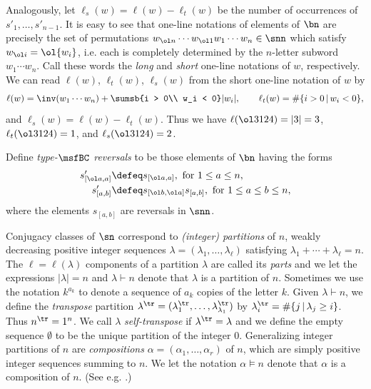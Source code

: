 Analogously, let $\ell_s(w) = \ell(w) - \ell_t(w)$ be the number
of occurrences of $s'_1,\dotsc,s'_{n-1}$.
It is easy to see that one-line notations of
elements of $\bn$ are precisely the set of
permutations $w_{\ol n} \cdots w_{\ol 1} w_1 \cdots w_n \in \snn$
which satisfy $w_{\ol i} = \ol{w_i}$,
i.e. each is completely determined by the $n$-letter subword
$w_1 \cdots w_n$.
Call these words the {\em long} and
{\em short}
one-line notations of $w$, respectively.
We can read $\ell(w)$, $\ell_t(w)$, $\ell_s(w)$ from the
short one-line notation of $w$ by
\begin{equation*}%
  \ell(w) = \inv(w_1 \cdots w_n) + \sumsb{i > 0\\ w_i < 0} |w_i|,
  \qquad
  \ell_t(w) = \# \{ i > 0 \,|\, w_i < 0 \},
  \end{equation*}
and $\ell_s(w) = \ell(w) - \ell_t(w)$.
Thus we have
  $\ell(\ol3124) = |3| = 3$, $\ell_t(\ol3124) = 1$, and $\ell_s(\ol3124) = 2$.

Define {\em type-$\msfBC$ reversals} to be those elements of $\bn$
having the forms
\begin{equation}\label{eq:creversal}
  \begin{aligned}
    s'_{\smash{[\ol a, a]}} &\defeq s_{\smash{[\ol a, a]}},
        \mbox{ for } 1 \leq a \leq n,\\
    s'_{\smash{[a,b]}} &\defeq s_{\smash{[\ol b, \ol a]}} s_{[a,b]},
    \mbox{ for } 1 \leq a \leq b \leq n,
  \end{aligned}
\end{equation}
where the elements $s_{[a,b]}$ are reversals in $\snn$.

\label{ss:conjclasses}
Conjugacy classes of $\sn$ correspond to {\em (integer) partitions} of $n$,
weakly decreasing positive integer sequences
$\lambda = (\lambda_1, \dotsc, \lambda_\ell)$
satisfying $\lambda_1 + \cdots + \lambda_\ell = n$.
The $\ell = \ell(\lambda)$ components of a partition $\lambda$
are called its {\em parts}
and we let the expressions
$|\lambda| = n$ and $\lambda \vdash n$ denote that $\lambda$ is
a partition of $n$.
Sometimes we use the notation $k^{a_k}$ to denote a
sequence of $a_k$ copies of the letter $k$.
Given $\lambda \vdash n$, we define the {\em transpose}
partition $\lambda^\tr = (\lambda_1^\tr, \dotsc,\lambda_{\lambda_1}^{\tr})$ by
$\lambda_i^\tr = \# \{ j \,|\, \lambda_j \geq i \}$. Thus $n^\tr = 1^n$.
We call $\lambda$ {\em self-transpose} if $\lambda^\tr = \lambda$
and we define the empty sequence $\emptyset$ to be the unique partition of the
integer $0$.
Generalizing integer partitions of $n$ are
{\em compositions} $\alpha = (\alpha_1,\dotsc, \alpha_r)$ of $n$,
which are simply positive integer sequences summing to $n$.
We let the notation $\alpha \vDash n$ denote that $\alpha$ is
a composition of $n$. (See e.g. \cite[\S 1.2]{StanEC1}.)

